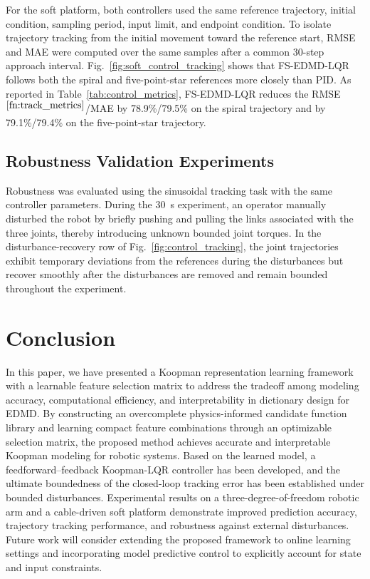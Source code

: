 \documentclass[final,3p,twocolumn,times]{elsarticle}
\begin{document}
For the soft platform, both controllers used the same reference trajectory,
initial condition, sampling period, input limit, and endpoint condition.
To isolate trajectory tracking from the initial movement toward the reference
start, RMSE and MAE were computed over the same samples after a common
30-step approach interval. Fig.~\ref{fig:soft_control_tracking} shows that
FS-EDMD-LQR follows both the spiral and five-point-star references more
closely than PID. As reported in Table~\ref{tab:control_metrics},
FS-EDMD-LQR reduces the RMSE$^{\ref{fn:track_metrics}}$/MAE by
78.9\%/79.5\% on the spiral trajectory and by 79.1\%/79.4\% on the
five-point-star trajectory.

\subsection{Robustness Validation Experiments}
\label{subsec:robustness_test}

Robustness was evaluated using the sinusoidal tracking task with the same controller parameters. During the 30~s experiment, an operator manually disturbed the robot by briefly pushing and pulling the links associated with the three joints, thereby introducing unknown bounded joint torques. In the disturbance-recovery row of Fig.~\ref{fig:control_tracking}, the joint trajectories exhibit temporary deviations from the references during the disturbances but recover smoothly after the disturbances are removed and remain bounded throughout the experiment.





\section{Conclusion}
\label{sec:conclusion}

In this paper, we have presented a Koopman representation learning framework with a learnable feature selection matrix to address the tradeoff among modeling accuracy, computational efficiency, and interpretability in dictionary design for EDMD. By constructing an overcomplete physics-informed candidate function library and learning compact feature combinations through an optimizable selection matrix, the proposed method achieves accurate and interpretable Koopman modeling for robotic systems. Based on the learned model, a feedforward--feedback Koopman-LQR controller has been developed, and the ultimate boundedness of the closed-loop tracking error has been established under bounded disturbances. Experimental results on a three-degree-of-freedom robotic arm and a cable-driven soft platform demonstrate improved prediction accuracy, trajectory tracking performance, and robustness against external disturbances. Future work will consider extending the proposed framework to online learning settings and incorporating model predictive control to explicitly account for state and input constraints.






\end{document}
